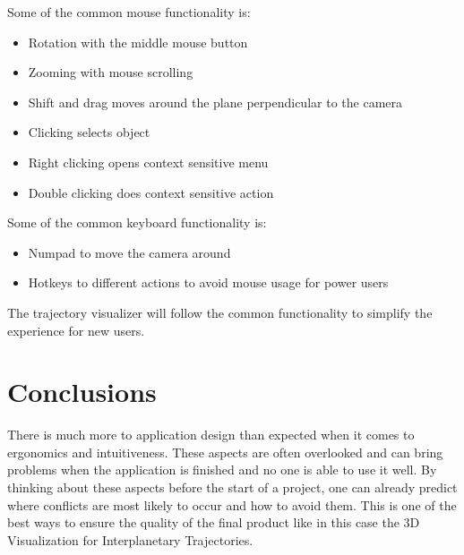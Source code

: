 \documentclass[a4paper,11pt]{article}
\begin{document}
Some of the common mouse functionality is:
\begin{itemize}
\item Rotation with the middle mouse button
\item Zooming with mouse scrolling
\item Shift and drag moves around the plane perpendicular to the camera
\item Clicking selects object
\item Right clicking opens context sensitive menu
\item Double clicking does context sensitive action
\end{itemize}

Some of the common keyboard functionality is:
\begin{itemize}
\item Numpad to move the camera around
\item Hotkeys to different actions to avoid mouse usage for power users
\end{itemize}

The trajectory visualizer will follow the common functionality to simplify the experience for new users.


\section{Conclusions}

There is much more to application design than expected when it comes to ergonomics and intuitiveness. These aspects are often overlooked and can bring problems when the application is finished and no one is able to use it well. By thinking about these aspects before the start of a project, one can already predict where conflicts are most likely to occur and how to avoid them. This is one of the best ways to ensure the quality of the final product like in this case the 3D Visualization for Interplanetary Trajectories.



\end{document}
